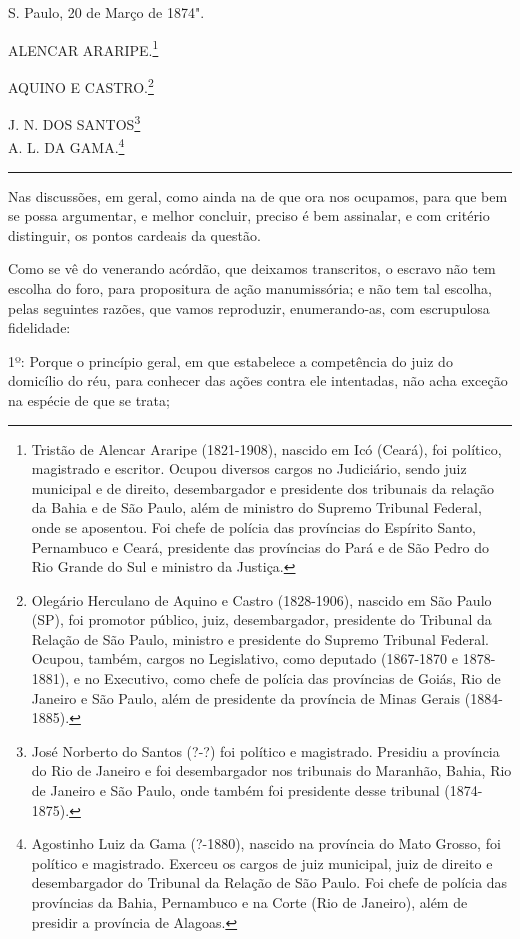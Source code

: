S. Paulo, 20 de Março de 1874".

ALENCAR ARARIPE.\footnote{Tristão de Alencar Araripe (1821-1908),
  nascido em Icó (Ceará), foi político, magistrado e escritor. Ocupou
  diversos cargos no Judiciário, sendo juiz municipal e de direito,
  desembargador e presidente dos tribunais da relação da Bahia e de São
  Paulo, além de ministro do Supremo Tribunal Federal, onde se
  aposentou. Foi chefe de polícia das províncias do Espírito Santo,
  Pernambuco e Ceará, presidente das províncias do Pará e de São Pedro
  do Rio Grande do Sul e ministro da Justiça.}

AQUINO E CASTRO.\footnote{Olegário Herculano de Aquino e Castro
  (1828-1906), nascido em São Paulo (SP), foi promotor público, juiz,
  desembargador, presidente do Tribunal da Relação de São Paulo,
  ministro e presidente do Supremo Tribunal Federal. Ocupou, também,
  cargos no Legislativo, como deputado (1867-1870 e 1878-1881), e no
  Executivo, como chefe de polícia das províncias de Goiás, Rio de
  Janeiro e São Paulo, além de presidente da província de Minas Gerais
  (1884-1885).}

J. N. DOS SANTOS\footnote{José Norberto do Santos (?-?) foi político e
  magistrado. Presidiu a província do Rio de Janeiro e foi desembargador
  nos tribunais do Maranhão, Bahia, Rio de Janeiro e São Paulo, onde
  também foi presidente desse tribunal (1874-1875).}\\
A. L. DA GAMA.\footnote{Agostinho Luiz da Gama (?-1880), nascido na
  província do Mato Grosso, foi político e magistrado. Exerceu os cargos
  de juiz municipal, juiz de direito e desembargador do Tribunal da
  Relação de São Paulo. Foi chefe de polícia das províncias da Bahia,
  Pernambuco e na Corte (Rio de Janeiro), além de presidir a província
  de Alagoas.}

\begin{center}\rule{0.5\linewidth}{\linethickness}\end{center}

Nas discussões, em geral, como ainda na de que ora nos ocupamos, para
que bem se possa argumentar, e melhor concluir, preciso é bem assinalar,
e com critério distinguir, os pontos cardeais da questão.

Como se vê do venerando acórdão, que deixamos transcritos, o escravo não
tem escolha do foro, para propositura de ação manumissória; e não tem
tal escolha, pelas seguintes razões, que vamos reproduzir,
enumerando-as, com escrupulosa fidelidade:

1º: Porque o princípio geral, em que estabelece a competência do juiz do
domicílio do réu, para conhecer das ações contra ele intentadas, não
acha exceção na espécie de que se trata;


